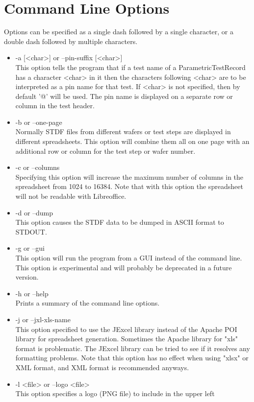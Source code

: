 \documentclass[letterpaper]{article}
\begin{document}
\section{Command Line Options}
Options can be specified as a single dash followed by a single character, or a double dash
followed by multiple characters.
\begin{itemize}
\item -a [<char>] or --pin-suffix [<char>]\\
This option tells the program that if a test name of a ParametricTestRecord has
a character <char> in it then the characters following <char> are to be interpreted
as a pin name for that test.  If <char> is not specified, then by default '@' will be used.
The pin name is displayed on a separate row or column in the test header.
\item -b or --one-page\\
Normally STDF files from different wafers or test steps are displayed in different spreadsheets.
This option will combine them all on one page with an additional row or column for the test
step or wafer number.
\item -c or --columns\\
Specifying this option will increase the maximum number of columns in the spreadsheet
from 1024 to 16384.  Note that with this option the spreadsheet will not be
readable with Libreoffice.
\item -d or --dump\\
This option causes the STDF data to be dumped in ASCII format to STDOUT.
\item -g or --gui\\
This option will run the program from a GUI instead of the command line.  This option
is experimental and will probably be deprecated in a future version.
\item -h or --help\\
Prints a summary of the command line options.
\item -j or --jxl-xls-name\\
This option specified to use the JExcel library instead of the Apache POI library
for spreadsheet generation.  Sometimes the Apache library for "xls" format is problematic.
The JExcel library can be tried to see if it resolves any formatting problems.  Note
that this option has no effect when using "xlsx" or XML format, and XML format is
recommended anyways.
\item -l <file> or --logo <file>\\
This option specifies a logo (PNG file) to include in the upper left

\end{itemize}
\end{document}

